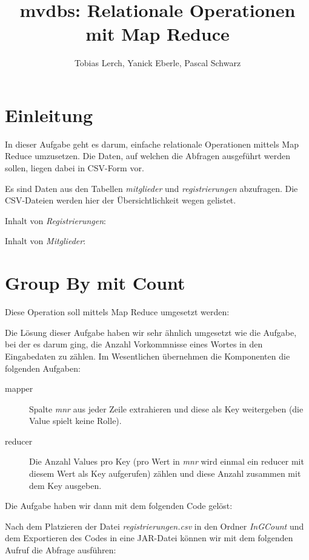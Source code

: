 \documentclass[11pt,a4paper,parskip=half]{scrartcl}
\title{mvdbs: Relationale Operationen mit Map Reduce}
\author{Tobias Lerch, Yanick Eberle, Pascal Schwarz}
\begin{document}
\maketitle

\pagestyle{fancy}
\section{Einleitung}
In dieser Aufgabe geht es darum, einfache relationale Operationen mittels Map Reduce umzusetzen. Die Daten, auf welchen die Abfragen ausgeführt werden sollen, liegen dabei in CSV-Form vor.

Es sind Daten aus den Tabellen \emph{mitglieder} und \emph{registrierungen} abzufragen. Die CSV-Dateien werden hier der Übersichtlichkeit wegen gelistet.

Inhalt von \emph{Registrierungen}:


Inhalt von \emph{Mitglieder}:


\newpage
\section{Group By mit Count}
Diese Operation soll mittels Map Reduce umgesetzt werden:


Die Lösung dieser Aufgabe haben wir sehr ähnlich umgesetzt wie die Aufgabe, bei der es darum ging, die Anzahl Vorkommnisse eines Wortes in den Eingabedaten zu zählen. Im Wesentlichen übernehmen die Komponenten die folgenden Aufgaben:

\begin{description}
	\item[mapper] Spalte \emph{mnr} aus jeder Zeile extrahieren und diese als Key weitergeben (die Value spielt keine Rolle).
	\item[reducer] Die Anzahl Values pro Key (pro Wert in \emph{mnr} wird einmal ein reducer mit diesem Wert als Key aufgerufen) zählen und diese Anzahl zusammen mit dem Key ausgeben.
\end{description}

Die Aufgabe haben wir dann mit dem folgenden Code gelöst:


Nach dem Platzieren der Datei \emph{registrierungen.csv} in den Ordner \emph{InGCount} und dem Exportieren des Codes in eine JAR-Datei können wir mit dem folgenden Aufruf die Abfrage ausführen:

\end{document}
